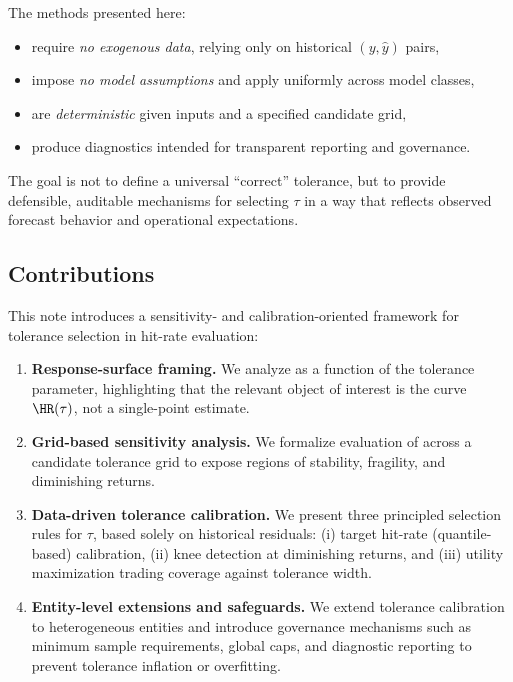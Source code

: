 The methods presented here:
\begin{itemize}[leftmargin=*]
    \item require \emph{no exogenous data}, relying only on historical
          \((y, \hat{y})\) pairs,
    \item impose \emph{no model assumptions} and apply uniformly across model
          classes,
    \item are \emph{deterministic} given inputs and a specified candidate grid,
    \item produce diagnostics intended for transparent reporting and governance.
\end{itemize}

The goal is not to define a universal ``correct'' tolerance, but to provide
defensible, auditable mechanisms for selecting \(\tau\) in a way that reflects
observed forecast behavior and operational expectations.

\subsection{Contributions}
\label{subsec:contributions}

This note introduces a sensitivity- and calibration-oriented framework for
tolerance selection in hit-rate evaluation:

\begin{enumerate}[leftmargin=*]
    \item \textbf{Response-surface framing.}
    We analyze \HRtau{} as a function of the tolerance parameter, highlighting
    that the relevant object of interest is the curve \(\HR(\tau)\), not a
    single-point estimate.

    \item \textbf{Grid-based sensitivity analysis.}
    We formalize evaluation of \HRtau{} across a candidate tolerance grid to
    expose regions of stability, fragility, and diminishing returns.

    \item \textbf{Data-driven tolerance calibration.}
    We present three principled selection rules for \(\tau\), based solely on
    historical residuals:
    (i) target hit-rate (quantile-based) calibration,
    (ii) knee detection at diminishing returns, and
    (iii) utility maximization trading coverage against tolerance width.

    \item \textbf{Entity-level extensions and safeguards.}
    We extend tolerance calibration to heterogeneous entities and introduce
    governance mechanisms such as minimum sample requirements, global caps, and
    diagnostic reporting to prevent tolerance inflation or overfitting.
\end{enumerate}

